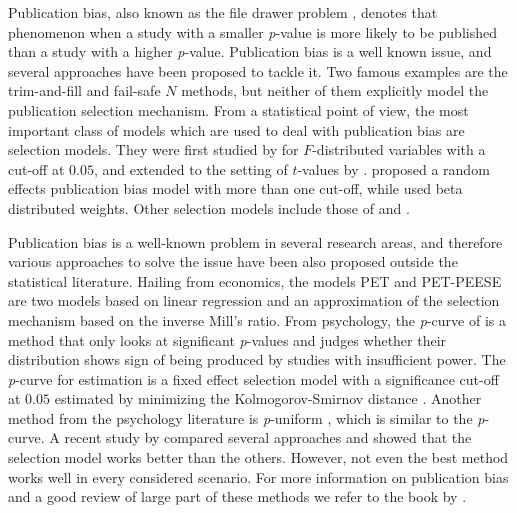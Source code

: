 \documentclass[useAMS,usenatbib,referee]{biom}
\begin{document}
Publication bias, also known as the file drawer problem \citep[see, e.g.,][]{iyengar1988selection}, denotes that phenomenon when a study with a smaller \textit{p}-value is more likely to be published than a study with a higher \textit{p}-value. Publication bias is a well known issue, and several approaches have been proposed to tackle it. Two famous examples are the trim-and-fill \citep{duval2000trim} and fail-safe $N$ \citep{becker2005failsafe} methods, but neither of them explicitly model the publication selection mechanism. From a statistical point of view, the most important class of models which are used to deal with publication bias are selection models. They were first studied by \citet{hedges1984estimation} for $F$-distributed variables with a cut-off at $0.05$, and extended to the setting of $t$-values by \citet{iyengar1988selection}. \citet{hedges1992modeling} proposed a random effects publication bias model with more than one cut-off, while \citet{citkowicz2017parsimonious} used beta distributed weights. Other selection models include those of \cite{dear1992approach} and \cite{CopasShi2000}.

Publication bias is a well-known problem in several research areas, and therefore various approaches to solve the issue have been also proposed outside the statistical literature. Hailing from economics, the models PET and PET-PEESE \citep{stanley2014meta} are two models based on linear regression and an approximation of the selection mechanism based on the inverse Mill's ratio. From psychology, the \textit{p}-curve of \citet{simonsohn2014p} is a method that only looks at significant \textit{p}-values and judges whether their distribution shows sign of being produced by studies with insufficient power. The \textit{p}-curve for estimation \citep{simonsohn2014} is a fixed effect selection model with a significance cut-off at $0.05$ estimated by minimizing the Kolmogorov-Smirnov distance \citep{mcshane2016adjusting}. Another method from the psychology literature is \textit{p}-uniform \citep{van2015meta}, which is similar to the \textit{p}-curve. A recent study by \citet{carter2019correcting} compared several approaches and showed that the selection model works better than the others. However, not even the best method works well in every considered scenario. For more information on publication bias and a good review of large part of these methods we refer to the book by \citet{rothstein2006publication}.
\end{document}
